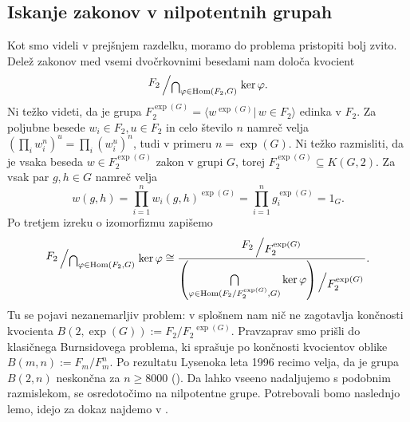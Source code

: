 \subsection{Iskanje zakonov v nilpotentnih grupah}

Kot smo videli v prejšnjem razdelku, moramo do problema pristopiti bolj zvito. Delež zakonov med vsemi dvočrkovnimi besedami nam določa kvocient \begin{equation*}
\bigslant{F_2}{\bigcap_{\varphi \in \operatorname{Hom}(F_2, G)}} \operatorname{ker} \varphi.  
\end{equation*}  
Ni težko videti, da je grupa $F_2^{\exp(G)} =  \langle w^{\exp(G)}  \vert \, w \in F_2 \rangle$ edinka v $F_2$. Za poljubne besede $w_i \in F_2, u \in  F_2$ in celo število $n$ namreč velja $(\prod_{i} w_i^n)^u = \prod_{i} (w_i^u)^n$,
tudi v primeru $n = \exp(G)$.
Ni težko razmisliti, da je vsaka beseda $w \in  F_2^{\exp(G)}$ zakon v grupi $G$, torej $F_2^{\exp(G)} \subseteq K(G, 2)$. Za vsak par $g, h \in G$ namreč velja \begin{equation*}
w(g, h) =  \prod_{i = 1}^{n} w_i(g,h)^{\exp(G)} = \prod_{i = 1}^{n} g_i^{\exp(G)} = 1_G.
\end{equation*}  
Po tretjem izreku o izomorfizmu zapišemo
\begin{equation*}
    \bigslant{F_2}{\bigcap_{\varphi \in \operatorname{Hom}(F_2, G)}} \operatorname{ker} \varphi \cong \dfrac{\bigslant{F_2}{F_2^{\exp(G)}}}{\bigslant{ \left( \bigcap\limits_{\varphi \in \operatorname{Hom}({F_2} / {F_2^{\exp(G)}}, G)} \ker \varphi \right) }{F_2^{\exp(G)}}}.
\end{equation*}  
Tu se pojavi nezanemarljiv problem: v splošnem nam nič ne zagotavlja končnosti kvocienta $B(2, \exp(G)) := F_2 / {F_2}^{\exp(G)}$. 
Pravzaprav smo prišli do klasičnega Burnsidovega problema, ki sprašuje po končnosti kvocientov oblike $B(m, n) := F_m / F_m^n$.
Po rezultatu Lysenoka leta 1996 recimo velja, da je grupa $B(2, n)$ neskončna za $n \ge 8000$ (\cite[str.~2]{Vaughan-Lee_1999}). 
Da lahko vseeno nadaljujemo s podobnim razmislekom, se osredotočimo na nilpotentne grupe. 
Potrebovali bomo naslednjo lemo, idejo za dokaz najdemo v \cite[str.~13--14]{Segal_1983}.

